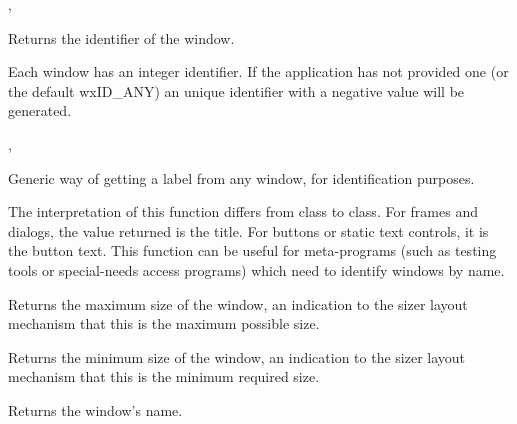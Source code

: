 
, 


\label{wxwindowgetid}


Returns the identifier of the window.


Each window has an integer identifier. If the application has not provided one
(or the default wxID\_ANY) an unique identifier with a negative value will be generated.


,\rtfsp
{}


\label{wxwindowgetlabel}


Generic way of getting a label from any window, for
identification purposes.


The interpretation of this function differs from class to class.
For frames and dialogs, the value returned is the title. For buttons or static text controls, it is
the button text. This function can be useful for meta-programs (such as testing
tools or special-needs access programs) which need to identify windows
by name.

\label{wxwindowgetmaxsize}


Returns the maximum size of the window, an indication to the sizer layout mechanism
that this is the maximum possible size.

\label{wxwindowgetminsize}


Returns the minimum size of the window, an indication to the sizer layout mechanism
that this is the minimum required size.

\label{wxwindowgetname}


Returns the window's name.


